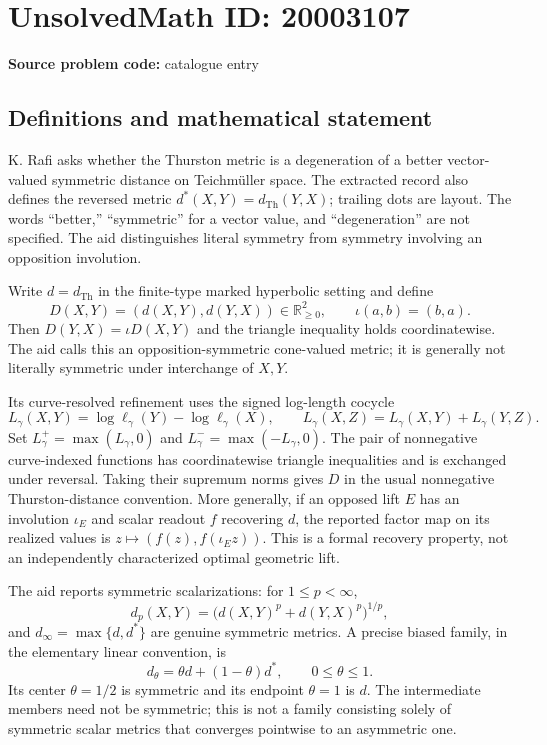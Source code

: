 \documentclass[11pt]{article}
\newcommand{\R}{\mathbb{R}}
\begin{document}
\section*{UnsolvedMath ID: 20003107}
\textbf{Source problem code:} catalogue entry
\subsection{Definitions and mathematical statement}
K. Rafi asks whether the Thurston metric is a degeneration of a better vector-valued symmetric distance on Teichm\"uller space. The extracted record also defines the reversed metric $d^*(X,Y)=d_{\mathrm{Th}}(Y,X)$; trailing dots are layout. The words ``better,'' ``symmetric'' for a vector value, and ``degeneration'' are not specified. The aid distinguishes literal symmetry from symmetry involving an opposition involution.

Write $d=d_{\mathrm{Th}}$ in the finite-type marked hyperbolic setting and define
\[
 D(X,Y)=(d(X,Y),d(Y,X))\in\R_{\geq0}^2,
 \qquad\iota(a,b)=(b,a).
\]
Then $D(Y,X)=\iota D(X,Y)$ and the triangle inequality holds coordinatewise. The aid calls this an opposition-symmetric cone-valued metric; it is generally not literally symmetric under interchange of $X,Y$.

Its curve-resolved refinement uses the signed log-length cocycle
\[
 L_\gamma(X,Y)=\log\ell_\gamma(Y)-\log\ell_\gamma(X),\qquad
 L_\gamma(X,Z)=L_\gamma(X,Y)+L_\gamma(Y,Z).
\]
Set $L_\gamma^+=\max(L_\gamma,0)$ and $L_\gamma^-=\max(-L_\gamma,0)$. The pair of nonnegative curve-indexed functions has coordinatewise triangle inequalities and is exchanged under reversal. Taking their supremum norms gives $D$ in the usual nonnegative Thurston-distance convention. More generally, if an opposed lift $E$ has an involution $\iota_E$ and scalar readout $f$ recovering $d$, the reported factor map on its realized values is $z\mapsto(f(z),f(\iota_Ez))$. This is a formal recovery property, not an independently characterized optimal geometric lift.

The aid reports symmetric scalarizations: for $1\leq p<\infty$,
\[
 d_p(X,Y)=\bigl(d(X,Y)^p+d(Y,X)^p\bigr)^{1/p},
\]
and $d_\infty=\max\{d,d^*\}$ are genuine symmetric metrics. A precise biased family, in the elementary linear convention, is
\[
 d_\theta=\theta d+(1-\theta)d^*,\qquad0\leq\theta\leq1.
\]
Its center $\theta=1/2$ is symmetric and its endpoint $\theta=1$ is $d$. The intermediate members need not be symmetric; this is not a family consisting solely of symmetric scalar metrics that converges pointwise to an asymmetric one.
\end{document}
